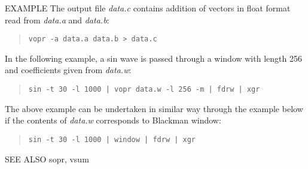 \begin{qsection}{EXAMPLE}
The output file {\em data.c} contains addition of
vectors in float format read from {\em data.a} and {\em data.b}:
\begin{quote}
  \verb!vopr -a data.a data.b > data.c !
\end{quote}
\par
In the following example, a sin wave is passed through
a window with length 256 and coefficients given from
{\em data.w}:
\begin{quote}
  \verb!sin -t 30 -l 1000 | vopr data.w -l 256 -m | fdrw | xgr!
\end{quote}
The above example can be undertaken in similar way
through the example below if the contents of {\em data.w} corresponds
to Blackman window:
\begin{quote}
  \verb!sin -t 30 -l 1000 | window | fdrw | xgr!
\end{quote}
\end{qsection}

\begin{qsection}{SEE ALSO}
  sopr, vsum
\end{qsection}
